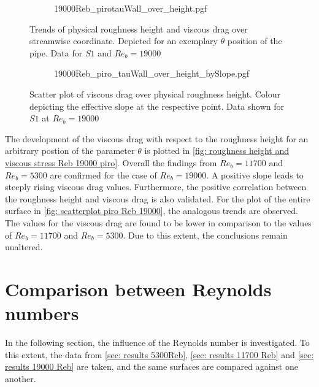 \begin{figure}
    \centering
    \begin{subfigure}{0.75\textwidth}
        \centering
        {19000Reb_pirotauWall_over_height.pgf}
    \end{subfigure}
    \caption[Trends of physical roughness height and viscous drag over streamwise coordinate at $Re_b = 19000$]{Trends of physical roughness height and viscous drag over streamwise coordinate. Depicted for an exemplary $\theta$ position of the pipe. Data for $S1$ and $Re_b = 19000$}
    \label{fig: roughness height and viscous stress Reb 19000 piro}
\end{figure}
\begin{figure}
    \centering
    \begin{subfigure}{0.7\textwidth}
        \hspace{0.9cm}
        {19000Reb_piro_tauWall_over_height_bySlope.pgf}
    \end{subfigure}
    \caption[Scatter plot of viscous drag over physical roughness height at $Re_b = 19000$]{Scatter plot of viscous drag over physical roughness height. Colour depicting the effective slope at the respective point. Data shown for $S1$ at $Re_b = 19000$}
    \label{fig: scatterplot piro Reb 19000}
\end{figure}


The development of the viscous drag with respect to the roughness height for an arbitrary postion of the parameter $\theta$ is plotted in \autoref{fig: roughness height and viscous stress Reb 19000 piro}.
Overall the findings from $Re_b = 11700$ and $Re_b = 5300$ are confirmed for the case of $Re_b = 19000$.
A positive slope leads to steeply rising viscous drag values.
Furthermore, the positive correlation between the roughness height and viscous drag is also validated.
For the plot of the entire surface in \autoref{fig: scatterplot piro Reb 19000}, the analogous trends  are observed.
The values for the viscous drag are found to be lower in comparison to  the values of $Re_b = 11700$ and $Re_b = 5300$.
Due to this extent, the conclusions remain unaltered.

\section{Comparison between Reynolds numbers}
In the following section, the influence of the Reynolds number is investigated.
To this extent, the data from \autoref{sec: results 5300Reb}, \autoref{sec: results 11700 Reb} and \autoref{sec: results 19000 Reb} are taken, and the same surfaces are compared against one another.
